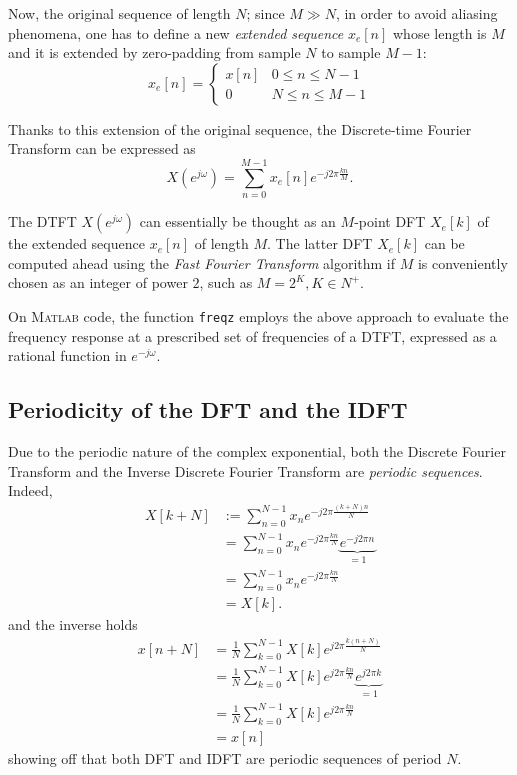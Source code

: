 \documentclass[\documentfontsize, twocolumn]{\classname}
\begin{document}
Now, the original sequence of length $N$; since $M\gg N$, in order to avoid aliasing phenomena, one has to define a new \emph{extended sequence} $x_e[n]$ whose length is $M$ and it is extended by zero-padding from sample $N$ to sample $M-1$:
\[
    x_e[n] = 
\left\{
    \begin{array}{ll}
        x[n] & 0 \leq n \leq N-1\\
        0 & N \leq n \leq M-1
    \end{array}
\right.
\]

Thanks to this extension of the original sequence, the Discrete-time Fourier Transform can be expressed as
\[
    X(e^{j\omega}) = \sum_{n=0}^{M-1} x_e[n] e^{-j2\pi \frac{kn}{M}}.
\]

The DTFT $X(e^{j\omega})$ can essentially be thought as an $M$-point DFT $X_e[k]$ of the extended sequence $x_e[n]$ of length $M$. The latter DFT $X_e[k]$ can be computed ahead using the \emph{Fast Fourier Transform} algorithm if $M$ is conveniently chosen as an integer of power $2$, such as $M = 2^K, K \in N^+$.

On \textsc{Matlab} code, the function \texttt{freqz} employs the above approach to evaluate the frequency response at a prescribed set of frequencies of a DTFT, expressed as a rational function in $e^{-j\omega}$.

\subsection{Periodicity of the DFT and the IDFT}

Due to the periodic nature of the complex exponential, both the Discrete Fourier Transform and the Inverse Discrete Fourier Transform are \emph{periodic sequences}. Indeed,
\begin{align*}
    X[k+N]
    &:= \sum_{n=0}^{N-1} x_n e^{-j2\pi\frac{(k+N)n}{N}} \\
    &= \sum_{n=0}^{N-1} x_n e^{-j2\pi\frac{kn}{N}}\underbrace{e^{-j2\pi n}}_{=1} \\
    &= \sum_{n=0}^{N-1} x_n e^{-j2\pi\frac{kn}{N}}\\
    &= X[k].
\end{align*}
and the inverse holds
\begin{align*}
    x[n+N] 
    &= \frac 1 N \sum_{k=0}^{N-1}X[k] e^{j2\pi \frac{k(n+N)}{N}}\\
    &= \frac 1 N \sum_{k=0}^{N-1}X[k] e^{j2\pi \frac{kn}{N}}\underbrace{e^{j2\pi k}}_{=1}\\
    &= \frac 1 N \sum_{k=0}^{N-1}X[k] e^{j2\pi \frac{kn}{N}}\\
    &= x[n]
\end{align*}
showing off that both DFT and IDFT are periodic sequences of period $N$.
\end{document}
